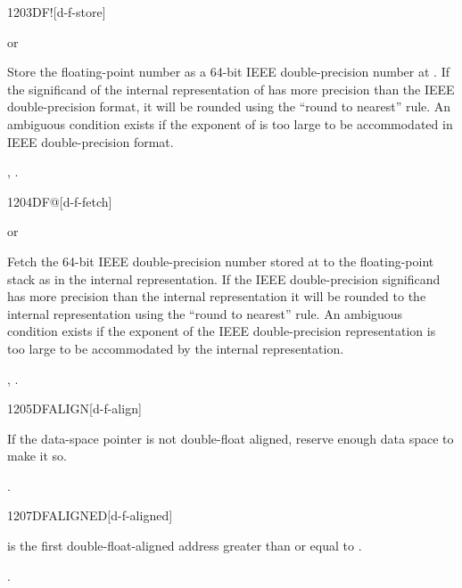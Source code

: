 \begin{worddef}{1203}{DF!}[d-f-store]
\item {}  or

	Store the floating-point number  as a 64-bit IEEE
	double-precision number at . If the significand
	of the internal representation of  has more precision than
	the IEEE double-precision format, it will be rounded using the
	``round to nearest'' rule. An ambiguous condition exists if the
	exponent of  is too large to be accommodated in IEEE
	double-precision format.

\see {},
	.
\end{worddef}


\begin{worddef}{1204}{DF@}[d-f-fetch]
\item {}  or

	Fetch the 64-bit IEEE double-precision number stored at
	 to the floating-point stack as  in the
	internal representation. If the IEEE double-precision
	significand has more precision than the internal representation
	it will be rounded to the internal representation using the
	``round to nearest'' rule. An ambiguous condition exists if the
	exponent of the IEEE double-precision representation is too
	large to be accommodated by the internal representation.

\see {},
	.
\end{worddef}


\begin{worddef}{1205}{DFALIGN}[d-f-align]
\item \stack{}{}

	If the data-space pointer is not double-float aligned, reserve
	enough data space to make it so.

\see {}.
\end{worddef}


\begin{worddef}{1207}{DFALIGNED}[d-f-aligned]
\item {}

	 is the first double-float-aligned address greater
	than or equal to .

\see {}.
\end{worddef}

